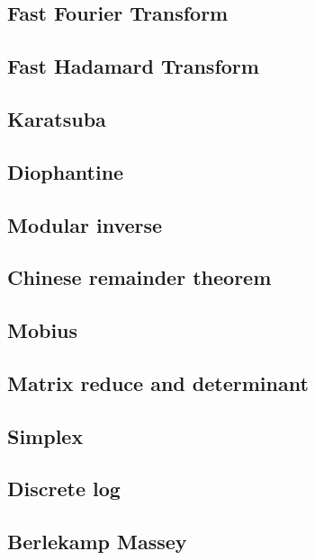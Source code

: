 \subsection{Fast Fourier Transform}
\subsection{Fast Hadamard Transform}
\subsection{Karatsuba}
\subsection{Diophantine}
\subsection{Modular inverse}
\subsection{Chinese remainder theorem}
\subsection{Mobius}
\subsection{Matrix reduce and determinant}
\subsection{Simplex}
\subsection{Discrete log}
\subsection{Berlekamp Massey}
